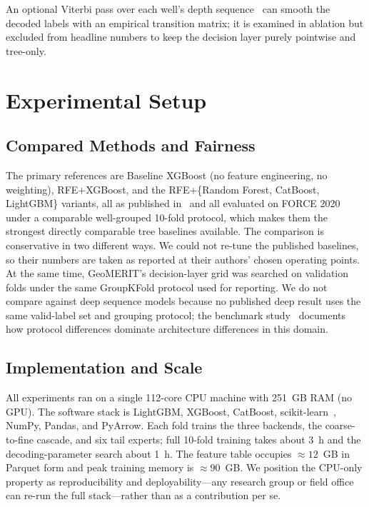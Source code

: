 \documentclass[bdcc,article,submit,pdftex,moreauthors]{Definitions/mdpi}
\begin{document}
An optional Viterbi pass over each well's depth sequence~\cite{viterbi1967,lafferty2001crf,sarawagi2004semimarkov}
can smooth the decoded labels with an empirical transition matrix; it is examined in
ablation but excluded from headline numbers to keep the decision layer purely pointwise and
tree-only.

\section{Experimental Setup}
\label{sec:setup}

\subsection{Compared Methods and Fairness}
\label{sec:compared}
The primary references are Baseline XGBoost (no feature engineering, no weighting),
RFE+XGBoost, and the RFE+\{Random Forest, CatBoost, LightGBM\} variants, all as published
in~\cite{chen2026rfe} and all evaluated on FORCE 2020 under a comparable well-grouped 10-fold
protocol, which makes them the strongest directly comparable tree baselines available. The
comparison is conservative in two different ways. We could not re-tune the published baselines,
so their numbers are taken as reported at their authors' chosen operating points. At the same
time, GeoMERIT's decision-layer grid was searched on validation folds under the same GroupKFold
protocol used for reporting. We do not compare
against deep sequence models because no published deep result uses the same valid-label set
and grouping protocol; the benchmark study~\cite{carvalho2026benchmark} documents how
protocol differences dominate architecture differences in this domain.

\subsection{Implementation and Scale}
\label{sec:impl}
All experiments ran on a single 112-core CPU machine with 251~GB RAM (no GPU). The software
stack is LightGBM, XGBoost, CatBoost, scikit-learn~\cite{pedregosa2011sklearn}, NumPy,
Pandas, and PyArrow. Each fold trains the three backends, the coarse-to-fine cascade, and
six tail experts; full 10-fold training takes about 3~h and the decoding-parameter search
about 1~h. The feature table occupies $\approx\!12$~GB in Parquet form and peak training
memory is $\approx\!90$~GB. We position the CPU-only property as reproducibility and
deployability---any research group or field office can re-run the full stack---rather than
as a contribution per se.
\end{document}
